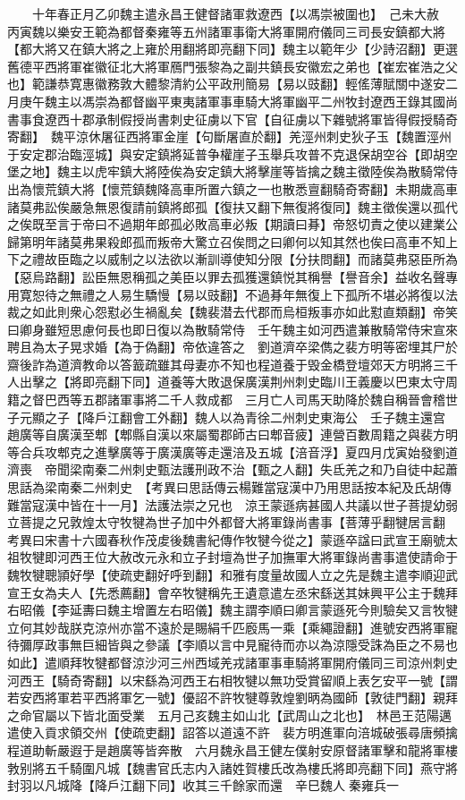 　　十年春正月乙卯魏主遣永昌王健督諸軍救遼西【以馮崇被圍也】　己未大赦　丙寅魏以樂安王範為都督秦雍等五州諸軍事衛大將軍開府儀同三司長安鎮都大將【都大將又在鎮大將之上雍於用翻將即亮翻下同】魏主以範年少【少詩沼翻】更選舊德平西將軍崔徽征北大將軍鴈門張黎為之副共鎮長安徽宏之弟也【崔宏崔浩之父也】範謙恭寛惠徽務敦大體黎清約公平政刑簡易【易以豉翻】輕傜薄賦關中遂安二月庚午魏主以馮崇為都督幽平東夷諸軍事車騎大將軍幽平二州牧封遼西王錄其國尚書事食遼西十郡承制假授尚書刺史征虜以下官【自征虜以下雜號將軍皆得假授騎奇寄翻】　魏平涼休屠征西將軍金崖【句斷屠直於翻】羌涇州刺史狄子玉【魏置涇州于安定郡治臨涇城】與安定鎮將延普争權崖子玉舉兵攻普不克退保胡空谷【即胡空堡之地】魏主以虎牢鎮大將陸俟為安定鎮大將擊崖等皆擒之魏主徵陸俟為散騎常侍出為懷荒鎮大將【懷荒鎮魏降高車所置六鎮之一也散悉亶翻騎奇寄翻】未期歲高車諸莫弗訟俟嚴急無恩復請前鎮將郎孤【復扶又翻下無復將復同】魏主徵俟還以孤代之俟既至言于帝曰不過期年郎孤必敗高車必叛【期讀曰朞】帝怒切責之使以建業公歸第明年諸莫弗果殺郎孤而叛帝大驚立召俟問之曰卿何以知其然也俟曰高車不知上下之禮故臣臨之以威制之以法欲以漸訓導使知分限【分扶問翻】而諸莫弗惡臣所為【惡烏路翻】訟臣無恩稱孤之美臣以罪去孤獲還鎮悦其稱譽【譽音余】益收名聲專用寛恕待之無禮之人易生驕慢【易以豉翻】不過朞年無復上下孤所不堪必將復以法裁之如此則衆心怨懟必生禍亂矣【魏裴潜去代郡而烏桓叛事亦如此懟直類翻】帝笑曰卿身雖短思慮何長也即日復以為散騎常侍　壬午魏主如河西遣兼散騎常侍宋宣來聘且為太子晃求婚【為于偽翻】帝依違答之　劉道濟卒梁儁之裴方明等密埋其尸於齋後詐為道濟教命以答籖疏雖其母妻亦不知也程道養于毁金橋登壇郊天方明將三千人出擊之【將即亮翻下同】道養等大敗退保廣漢荆州刺史臨川王義慶以巴東太守周籍之督巴西等五郡諸軍事將二千人救成都　三月亡人司馬天助降於魏自稱晉會稽世子元顯之子【降戶江翻會工外翻】魏人以為青徐二州刺史東海公　壬子魏主還宫　趙廣等自廣漢至郫【郫縣自漢以來屬蜀郡師古曰郫音疲】連營百數周籍之與裴方明等合兵攻郫克之進擊廣等于廣漢廣等走還涪及五城【涪音浮】夏四月戊寅始發劉道濟喪　帝聞梁南秦二州刺史甄法護刑政不治【甄之人翻】失氐羌之和乃自徒中起蕭思話為梁南秦二州刺史　【考異曰思話傳云楊難當寇漢中乃用思話按本紀及氏胡傳難當寇漢中皆在十一月】法護法崇之兄也　涼王蒙遜病甚國人共議以世子菩提幼弱立菩提之兄敦煌太守牧犍為世子加中外都督大將軍錄尚書事【菩薄乎翻犍居言翻　考異曰宋書十六國春秋作茂䖍後魏書紀傳作牧犍今從之】蒙遜卒諡曰武宣王廟號太祖牧犍即河西王位大赦改元永和立子封壇為世子加撫軍大將軍錄尚書事遣使請命于魏牧犍聰頴好學【使疏吏翻好呼到翻】和雅有度量故國人立之先是魏主遣李順迎武宣王女為夫人【先悉薦翻】會卒牧犍稱先王遺意遣左丞宋繇送其妹興平公主于魏拜右昭儀【李延夀曰魏主增置左右昭儀】魏主謂李順曰卿言蒙遜死今則驗矣又言牧犍立何其妙哉朕克涼州亦當不遠於是賜絹千匹廏馬一乘【乘繩證翻】進號安西將軍寵待彌厚政事無巨細皆與之參議【李順以言中見寵待而亦以為涼隱受誅為臣之不易也如此】遣順拜牧犍都督涼沙河三州西域羌戎諸軍事車騎將軍開府儀同三司涼州刺史河西王【騎奇寄翻】以宋繇為河西王右相牧犍以無功受賞留順上表乞安平一號【謂若安西將軍若平西將軍乞一號】優詔不許牧犍尊敦煌劉昞為國師【敦徒門翻】親拜之命官屬以下皆北面受業　五月己亥魏主如山北【武周山之北也】　林邑王范陽邁遣使入貢求領交州【使疏吏翻】詔答以道遠不許　裴方明進軍向涪城破張尋唐頻擒程道助斬嚴遐于是趙廣等皆奔散　六月魏永昌王健左僕射安原督諸軍擊和龍將軍樓㪍别將五千騎圍凡城【魏書官氏志内入諸姓賀樓氏改為樓氏將即亮翻下同】燕守將封羽以凡城降【降戶江翻下同】收其三千餘家而還　辛巳魏人秦雍兵一